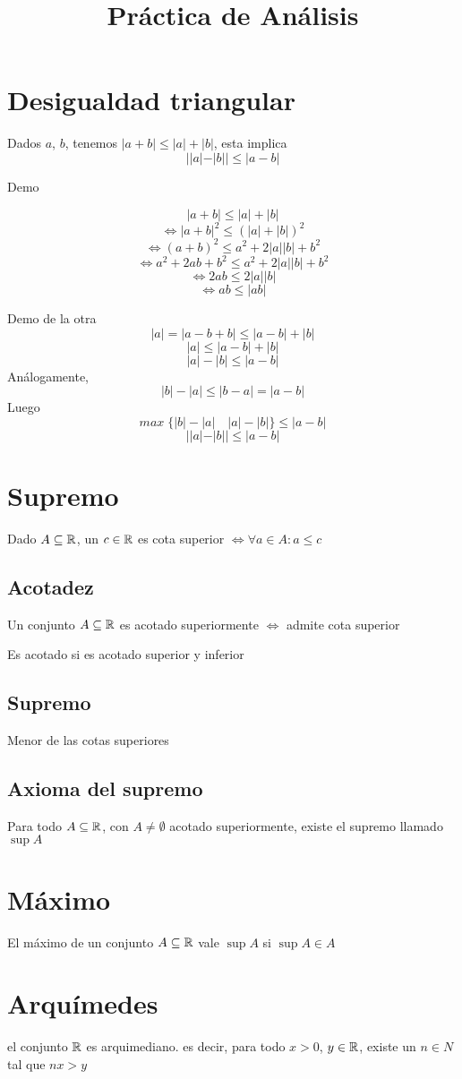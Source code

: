 \documentclass{article}
\title{Práctica de Análisis}
\begin{document}
\maketitle
\section{Desigualdad triangular}
Dados $a$, $b$, tenemos $|a + b| \leq |a| + |b|$, esta implica \[
	||a| - |b|| \leq |a-b|
\]

Demo

\[
	|a+b| \leq |a| + |b|
\]
\[
	\iff |a+b|^2 \leq (|a| + |b|)^2
\]
\[
	\iff (a+b)^2 \leq a^2 + 2|a||b| + b^2
\]
\[
	\iff a^2 + 2ab + b^2 \leq a^2 + 2|a||b| + b^2
\]
\[
	\iff 2ab \leq 2|a||b|
\]
\[
	\iff ab \leq |ab|
\]

Demo de la otra
\[
	|a| = |a-b+b| \leq |a-b| + |b|
\]
\[
	|a| \leq |a-b| + |b|
\]
\[
	|a| - |b| \leq |a-b|
\]
Análogamente, 
\[
	|b| - |a| \leq |b-a| = |a-b|
\]
Luego 
\[
	max \; \{|b| - |a| \quad |a| - |b|\} \leq |a-b|
\]
\[
	||a| - |b|| \leq |a-b|
\]

\section{Supremo}
Dado $A \subseteq \mathbb{R}$, un $c \in \mathbb{R}$ es cota superior $\iff \forall a \in A: a \leq c$
\subsection{Acotadez}
Un conjunto $A \subseteq \mathbb{R}$ es acotado superiormente $\iff$ admite cota superior

Es acotado si es acotado superior y inferior
\subsection{Supremo}
Menor de las cotas superiores
\subsection{Axioma del supremo}
Para todo $A \subseteq \mathbb{R}$, con $A \ne \emptyset$ acotado superiormente,
existe el supremo llamado $\sup A$

\section{Máximo}
El máximo de un conjunto $A \subseteq \mathbb{R}$ vale $\sup A$ si $\sup A \in A$
\section{Arquímedes}
el conjunto $\mathbb{R}$ es arquimediano. es decir, para todo $x>0$, $y\in \mathbb{R}$, existe un $n \in N$
tal que $nx > y$
\end{document}
